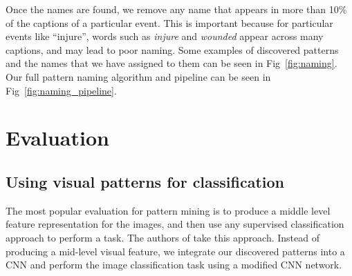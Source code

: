 \documentclass[10pt,twocolumn,letterpaper]{article}
\begin{document}
{Once the names are found, we remove any name that appears in more than 10\% of the captions of a particular event.
This is important because for particular events like ``injure'', words such as {\it injure} and {\it wounded} appear across many captions, and may lead to poor naming.
Some examples of discovered patterns and the names that we have assigned to them can be seen in Fig~\ref{fig:naming}.
Our full pattern naming algorithm and pipeline can be seen in Fig~\ref{fig:naming_pipeline}.

\section{Evaluation}
\subsection{Using visual patterns for classification}
\label{classification_eval}
The most popular evaluation for pattern mining is to produce a middle level feature representation for the images, and then use any supervised classification approach to perform a task.
The authors of \cite{LiLSH15CVPR} take this approach.
Instead of producing a mid-level visual feature, we integrate our discovered patterns into a CNN and perform the image classification task using a modified CNN network.

}
\end{document}
